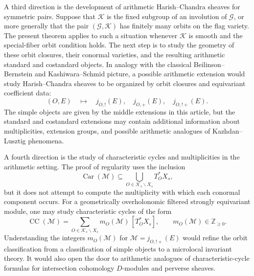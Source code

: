 \documentclass[11pt]{amsart}
\theoremstyle{plain}
\theoremstyle{definition}
\theoremstyle{remark}
\newcommand{\Car}{\operatorname{Car}}
\begin{document}
A third direction is the development of arithmetic Harish--Chandra sheaves for
symmetric pairs.  Suppose that \(\mathcal K\) is the fixed subgroup of an
involution of \(\mathcal G\), or more generally that the pair
\((\mathcal G,\mathcal K)\) has finitely many orbits on the flag variety.  The
present theorem applies to such a situation whenever \(\mathcal K\) is smooth
and the special-fiber orbit condition holds.  The next step is to study the
geometry of these orbit closures, their conormal varieties, and the resulting
arithmetic standard and costandard objects.  In analogy with the classical
Beilinson--Bernstein and Kashiwara--Schmid picture, a possible arithmetic extension would study
Harish--Chandra sheaves to be organized by orbit closures and equivariant
coefficient data:
\[
  (O,E)
  \quad\longmapsto\quad
  j_{O,!}(E),\quad j_{O,+}(E),\quad j_{O,!+}(E).
\]
The simple objects are given by the middle extensions in this article, but the
standard and costandard extensions may contain additional information about
multiplicities, extension groups, and possible arithmetic analogues of
Kazhdan--Lusztig phenomena.

A fourth direction is the study of characteristic cycles and multiplicities in
the arithmetic setting.  The proof of regularity uses the inclusion
\[
  \Car(\mathcal M)
  \subseteq
  \bigcup_{O\in\mathcal K_s\backslash X_s}T^*_O X_s,
\]
but it does not attempt to compute the multiplicity with which each conormal
component occurs.  For a geometrically overholonomic filtered strongly equivariant module, one may study characteristic cycles of the form
\[
  \operatorname{CC}(\mathcal M)
  =
  \sum_{O\in\mathcal K_s\backslash X_s}
  m_O(\mathcal M)\,[T^*_O X_s],
  \qquad
  m_O(\mathcal M)\in\mathbb Z_{\ge0}.
\]
Understanding the integers \(m_O(\mathcal M)\) for
\(\mathcal M=j_{O,!+}(E)\) would refine the orbit classification from a
classification of simple objects to a microlocal invariant theory.  It would
also open the door to arithmetic analogues of characteristic-cycle formulas
for intersection cohomology \(D\)-modules and perverse sheaves.
\end{document}

